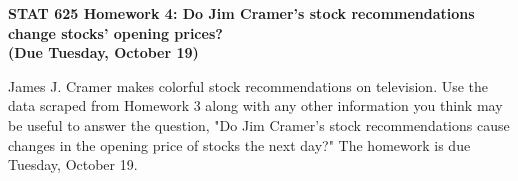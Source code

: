 \documentclass[12pt]{article}
\begin{document}
\doublespace




\begin{center}


{\Large\bf STAT 625 
Homework 4: Do Jim Cramer's stock recommendations change stocks'
opening prices? \\
(Due Tuesday, October 19)\\


}



\end{center}

\begin{raggedright}
\parindent=0.5in



\noindent James J. Cramer makes colorful stock recommendations on 
television.  Use
the data scraped from Homework 3 along with any other information you
think may be useful to answer the question, "Do Jim Cramer's stock 
recommendations cause changes in the opening price of stocks the next day?"
The homework is due Tuesday, October 19.

\end{raggedright}
\end{document}
